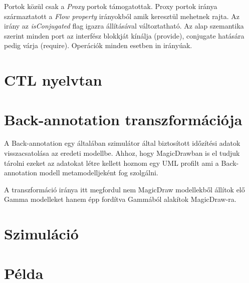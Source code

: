 Portok közül csak a \emph{Proxy} portok támogatottak. Proxy portok iránya származtatott a \emph{Flow property} irányokból amik keresztül mehetnek rajta. Az irány az \emph{isConjugated} flag igazra állításával változtatható. Az alap szemantika szerint minden port az interfész blokkját kínálja (provide), conjugate hatására pedig várja (require). Operációk minden esetben in irányúak.
 
\section{CTL nyelvtan}

\section{Back-annotation transzformációja}

A Back-annotation egy általában szimulátor által biztosított időzítési adatok visszacsatolása az eredeti modellbe. Ahhoz, hogy MagicDrawban is el tudjuk tárolni ezeket az adatokat létre kellett hoznom egy UML profilt ami a Back-annotation modell metamodelljeként fog szolgálni.

A transzformáció iránya itt megfordul nem MagicDraw modellekből állítok elő Gamma modelleket hanem épp fordítva Gammából alakítok MagicDraw-ra.



\section{Szimuláció}

\section{Példa} %